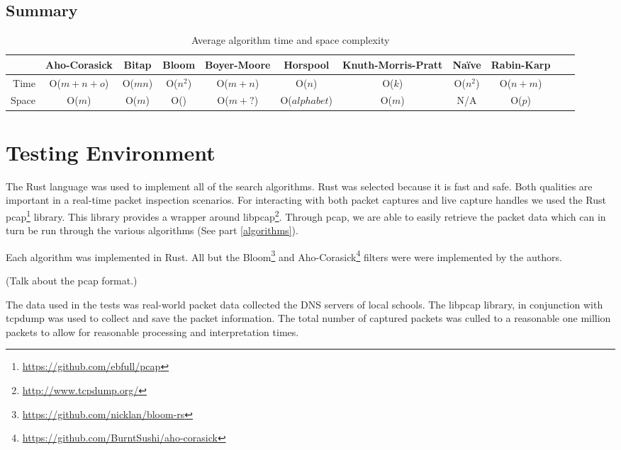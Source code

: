 \documentclass{article}
\begin{document}
\subsection{Summary} \label{sec:summary}

\begin{table}[h!bt]
  \centering
  \begin{tabular}{r|cccccccccc}
    & Aho-Corasick & Bitap & Bloom & Boyer-Moore & Horspool & Knuth-Morris-Pratt & Na{\"i}ve & Rabin-Karp\\
    \hline
    Time & O(\(m + n + o\)) & O(\(mn\)) & O(\(n^2\)) & O(\(m+n\)) & O(\(n\)) & O(\(k\)) & O(\(n^2\)) & O(\(n + m\)) \\
    Space & O(\(m\)) & O(\(m\)) & O(\(\)) & O(\(m + ?\)) & O(\(alphabet\)) & O(\(m\)) & N/A & O(\(p\))
  \end{tabular}
  \caption{Average algorithm time and space complexity}
  \label{table:algorithm-summary}
\end{table}


\section{Testing Environment} \label{sec:testing-environment}

The Rust language was used to implement all of the search algorithms. Rust was selected because it is fast and safe. Both  qualities are important in a real-time packet inspection scenarios. For interacting with both packet captures and live capture handles we used the Rust pcap\footnote{\url{https://github.com/ebfull/pcap}} library. This library provides a wrapper around libpcap\footnote{\url{http://www.tcpdump.org/}}. Through pcap, we are able to easily retrieve the packet data which can in turn be run through the various algorithms (See part \ref{algorithms}).

Each algorithm was implemented in Rust. All but the Bloom\footnote{\url{https://github.com/nicklan/bloom-rs}} \cite{Bloom1970} and Aho-Corasick\footnote{\url{https://github.com/BurntSushi/aho-corasick}} \cite{Aho1975} filters were were implemented by the authors.

(Talk about the pcap format.)

The data used in the tests was real-world packet data collected the DNS servers of local schools. The libpcap library, in conjunction with tcpdump was used to collect and save the packet information. The total number of captured packets was culled to a reasonable one million packets to allow for reasonable processing and interpretation times.
\end{document}
